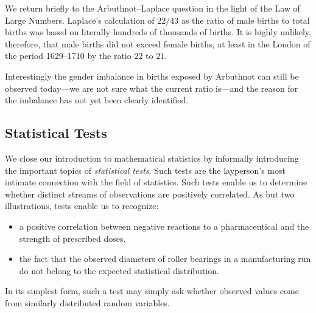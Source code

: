 \medskip

We return briefly to the Arbuthnot--Laplace question in the light of the Law of Large Numbers.  Laplace's calculation of $22/43$ as the ratio of  male births to total births was based on literally hundreds of thousands of births.  It is highly unlikely, therefore, that male births did not exceed female births, at least in the London of the period 1629--1710 by the ratio $22$ to $21$.

\medskip

\noindent
Interestingly the gender imbalance in births exposed by Arbuthnot can still be observed today---we are not sure what the current ratio is---and the reason for the imbalance has not yet been clearly identified.

\subsection{Statistical Tests}
\label{sec:stat-tests}


We close our introduction to mathematical statistics by informally introducing the important topics of {\em statistical tests}.  Such tests are the layperson's most intimate connection with the field of statistics.  Such tests enable us to determine whether distinct streams of observations are positively correlated.  As but two illustrations, tests enable us to recognize:
\begin{itemize}
\item
a positive correlation between negative reactions to a pharmaceutical and the strength of prescribed doses.  
\item
the fact that the observed diameters of roller bearings in a manufacturing run do not belong to the expected  statistical distribution.
\end{itemize}
In its simplest form, such a test may simply ask whether observed values come from similarly distributed random variables.

\medskip

